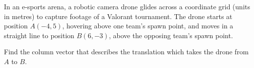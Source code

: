 \begin{question}
\noindent In an e-sports arena, a robotic camera drone glides across a coordinate grid (units in metres) to capture footage of a Valorant tournament. The drone starts at position $A(-4, 5)$, hovering above one team's spawn point, and moves in a straight line to position $B(6, -3)$, above the opposing team's spawn point.

\vspace{0.3cm}
\noindent Find the column vector that describes the translation which takes the drone from $A$ to $B$.

\vspace{4cm}

\begin{flushright}
\end{flushright}
\end{question}
